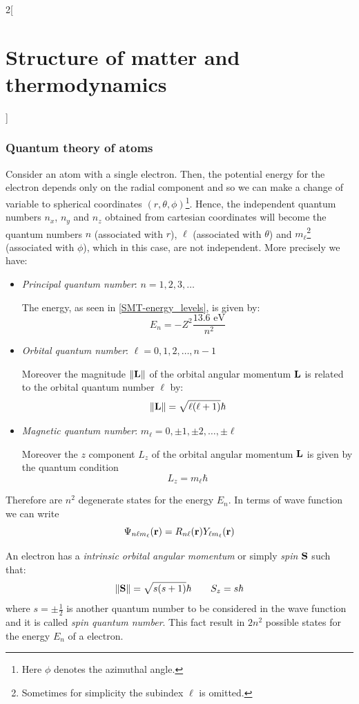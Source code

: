 \documentclass[../../../main.tex]{subfiles}
\begin{document}
\begin{multicols}{2}[\section{Structure of matter and thermodynamics}]
  \subsubsection{Quantum theory of atoms}
  \begin{definition}
    Consider an atom with a single electron. Then, the potential energy for the electron depends only on the radial component and so we can make a change of variable to spherical coordinates $(r,\theta,\phi)$\footnote{Here $\phi$ denotes the azimuthal angle.}. Hence, the independent quantum numbers $n_x$, $n_y$ and $n_z$ obtained from cartesian coordinates will become the quantum numbers $n$ (associated with $r$), $\ell$ (associated with $\theta$) and $m_\ell$\footnote{Sometimes for simplicity the subindex $\ell$ is omitted.} (associated with $\phi$), which in this case, are not independent. More precisely we have:
    \begin{itemize}
      \item \textit{Principal quantum number}: $n=1,2,3,\ldots$\par
            The energy, as seen in \eqref{SMT-energy_levels}, is given by: $$E_n=-Z^2\frac{13.6\text{ eV}}{n^2}$$
      \item \textit{Orbital quantum number}: $\ell=0,1,2,\ldots,n-1$\par Moreover the magnitude $\|\boldsymbol{\mathrm{L}}\|$ of the orbital angular momentum $\boldsymbol{\mathrm{L}}$ is related to the orbital quantum number $\ell$ by: $$\|\boldsymbol{\mathrm{L}}\|=\sqrt{\ell(\ell+1)}\hbar$$
      \item \textit{Magnetic quantum number}: $m_\ell=0,\pm 1,\pm 2,\ldots,\pm\ell$\par
            Moreover the $z$ component $L_z$ of the orbital angular momentum $\boldsymbol{\mathrm{L}}$ is given by the quantum condition $$L_z=m_\ell\hbar$$
    \end{itemize}
    Therefore are $n^2$ degenerate states for the energy $E_n$.
    In terms of wave function we can write $$\Psi_{n\ell m_\ell}(\boldsymbol{\mathrm{r}})=R_{n\ell}(\boldsymbol{\mathrm{r}})Y_{\ell m_\ell}(\boldsymbol{\mathrm{r}})$$
  \end{definition}
  \begin{definition}[Spin]
    An electron has a \textit{intrinsic orbital angular momentum} or simply \textit{spin $\boldsymbol{\mathrm{S}}$} such that:
    $$\|\boldsymbol{\mathrm{S}}\|=\sqrt{s(s+1)}\hbar\qquad S_z=s\hbar$$ where $s=\pm\frac{1}{2}$ is another quantum number  to be considered in the wave function and it is called \textit{spin quantum number}. This fact result in $2n^2$ possible states for the energy $E_n$ of a electron.

\end{definition}
\end{multicols}
\end{document}
